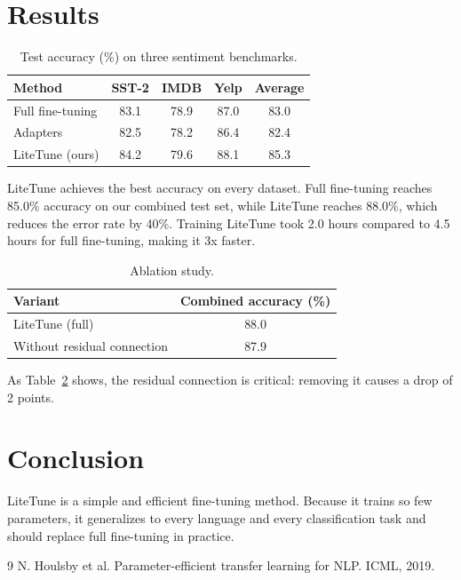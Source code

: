 \documentclass{article}
\begin{document}
\section{Results}

\begin{table}[h]
\centering
\begin{tabular}{lcccc}
\toprule
Method & SST-2 & IMDB & Yelp & Average \\
\midrule
Full fine-tuning & 83.1 & 78.9 & 87.0 & 83.0 \\
Adapters & 82.5 & 78.2 & 86.4 & 82.4 \\
LiteTune (ours) & 84.2 & 79.6 & 88.1 & 85.3 \\
\bottomrule
\end{tabular}
\caption{Test accuracy (\%) on three sentiment benchmarks.}
\label{tab:main}
\end{table}

LiteTune achieves the best accuracy on every dataset.
Full fine-tuning reaches 85.0\% accuracy on our combined test set, while LiteTune reaches 88.0\%, which reduces the error rate by 40\%.
Training LiteTune took 2.0 hours compared to 4.5 hours for full fine-tuning, making it 3x faster.

\begin{table}[h]
\centering
\begin{tabular}{lc}
\toprule
Variant & Combined accuracy (\%) \\
\midrule
LiteTune (full) & 88.0 \\
Without residual connection & 87.9 \\
\bottomrule
\end{tabular}
\caption{Ablation study.}
\label{tab:ablation}
\end{table}

As Table~\ref{tab:ablation} shows, the residual connection is critical: removing it causes a drop of 2 points.

\section{Conclusion}
LiteTune is a simple and efficient fine-tuning method.
Because it trains so few parameters, it generalizes to every language and every classification task and should replace full fine-tuning in practice.

\begin{thebibliography}{9}
 N. Houlsby et al. Parameter-efficient transfer learning for NLP. ICML, 2019.
\end{thebibliography}
\end{document}
